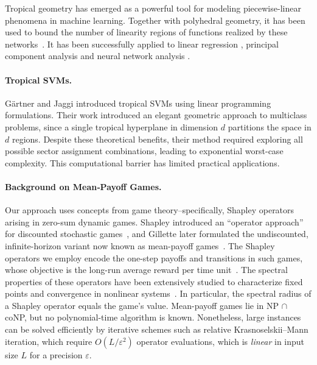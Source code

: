 \documentclass{article}
\begin{document}
Tropical geometry has emerged as a powerful tool for modeling piecewise-linear phenomena in machine learning. Together with polyhedral geometry,
it has been used to bound the number of linearity regions of functions realized by these networks~\cite{zhang2018,montufar}.
It has been successfully applied to linear regression \cite{maragos2020,akiangaubertqisaadi} , principal component analysis \cite{yoshida2019} and neural network analysis \cite{maragos2021}.

\paragraph{Tropical SVMs.} Gärtner and Jaggi \cite{gartner2008} introduced tropical SVMs using linear programming formulations. Their work introduced an elegant geometric approach to multiclass problems, since a single tropical hyperplane in dimension $d$ partitions the space in $d$ regions.
Despite these theoretical benefits, their method required exploring all possible sector assignment combinations, leading to exponential worst-case complexity. This computational barrier has limited practical applications.

\paragraph{Background on Mean‐Payoff Games.}
Our approach uses concepts from game theory--specifically, Shapley operators arising in zero-sum dynamic games.
Shapley introduced an ``operator approach'' for discounted stochastic games~\cite{shapley1953}, and Gillette later formulated the undiscounted, infinite-horizon variant now known as mean-payoff games~\cite{gillette1957}.
The Shapley operators we employ encode the one-step payoffs and transitions in such games, whose objective is the long-run average reward per time unit~\cite{zwick1996}. 
The spectral properties of these operators have been extensively studied to characterize fixed points and convergence in nonlinear systems~\cite{kolokoltsov1997,gaubert2004}.
In particular, the spectral radius of a Shapley operator equals the game's value.
Mean-payoff games lie in NP $\cap$ coNP, but no polynomial-time algorithm is known.
Nonetheless, large instances can be solved efficiently by iterative schemes such as relative Krasnoselskii--Mann iteration, which require $O(L/\varepsilon^2)$ operator evaluations, which is \emph{linear} in input size $L$ for a precision $\varepsilon$.
\end{document}
